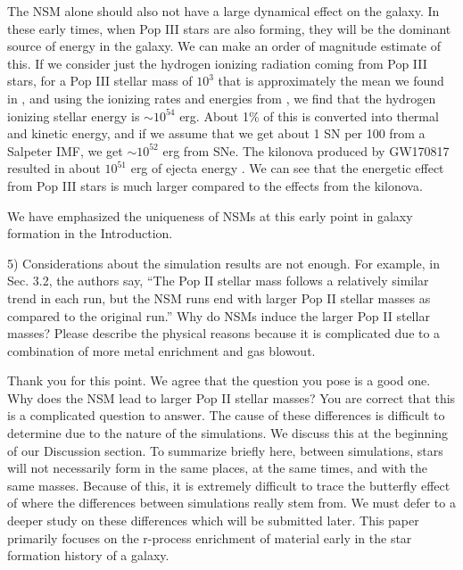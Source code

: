 \documentclass[11pt]{article}
\begin{document}
The NSM alone should also not have a large dynamical effect on the galaxy. In these early times, when Pop III stars are also forming, they will be the dominant source of energy in the galaxy. We can make an order of magnitude estimate of this. If we consider just the hydrogen ionizing radiation coming from Pop III stars, for a Pop III stellar mass of $10^3$ \Ms{} that is approximately the mean we found in \citep{Skinner20}, and using the ionizing rates and energies from \citet{Schaerer03}, we find that the hydrogen ionizing stellar energy is $\sim 10^{54}$ erg. About 1\% of this is converted into thermal and kinetic energy, and if we assume that we get about 1 SN per 100 from a Salpeter IMF, we get $\sim 10^{52}$ erg from SNe. The kilonova produced by GW170817 resulted in about $10^{51}$ erg of ejecta energy \citep{Metzger19}. We can see that the energetic effect from Pop III stars is much larger compared to the effects from the kilonova.

We have emphasized the uniqueness of NSMs at this early point in galaxy formation in the Introduction.

\begin{tcolorbox}[colback={lightgray}] 
    5)      Considerations about the simulation results are not enough. For example, in Sec. 3.2, the authors say, “The Pop II stellar mass follows a relatively similar trend in each run, but the NSM runs end with larger Pop II stellar masses as compared to the original run.” Why do NSMs induce the larger Pop II stellar masses? Please describe the physical reasons because it is complicated due to a combination of more metal enrichment and gas blowout.
\end{tcolorbox}

Thank you for this point. We agree that the question you pose is a good one. Why does the NSM lead to larger Pop II stellar masses? You are correct that this is a complicated question to answer. The cause of these differences is difficult to determine due to the nature of the simulations. We discuss this at the beginning of our Discussion section. To summarize briefly here, between simulations, stars will not necessarily form in the same places, at the same times, and with the same masses. Because of this, it is extremely difficult to trace the butterfly effect of where the differences between simulations really stem from. We must defer to a deeper study on these differences which will be submitted later. This paper primarily focuses on the r-process enrichment of material early in the star formation history of a galaxy.
\end{document}
